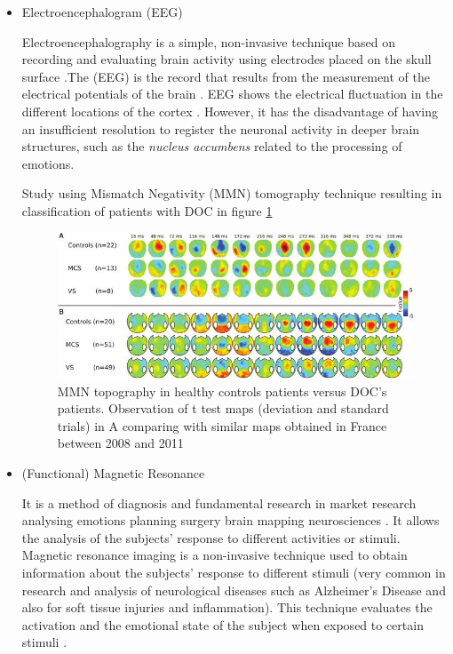  
\begin{itemize}


\item Electroencephalogram (EEG)

Electroencephalography is a simple, non-invasive technique based on recording and evaluating brain activity using electrodes placed on the skull surface \citep{Avilov2020} \citep{Da2019}.The (EEG) is the record that results from the measurement of the electrical potentials of the brain \cite{Bender2015} \citep{Xu2020}. EEG shows the electrical fluctuation in the different locations of the cortex  \citep{Zheng2016}. However, it has the disadvantage of having an insufficient resolution to register the neuronal activity in deeper brain structures, such as the \textit{nucleus accumbens} related to the processing of emotions\cite{Lang2010}. %

Study using Mismatch Negativity (MMN) tomography technique resulting in classification of patients with DOC in figure \ref{ferramentaMMN}
\begin{figure}[ht!]
\includegraphics[scale=0.7]{figures/MMN-topography-in-patients-with-disorders-of-consciousness-and-in-healthy-controls-The_W640.jpg}
\caption[DOC patient's MNN topography versus healthy control patients]{ MMN topography in healthy controls patients versus DOC’s patients. Observation of t test maps (deviation and standard trials) in A  comparing with  similar maps obtained in France between 2008 and 2011\cite{King2011}
\cite{Boly2011}} %
\label{ferramentaMMN}
\end{figure}

\item  (Functional) Magnetic Resonance

 It is a method of diagnosis and fundamental research in market research analysing emotions planning surgery brain mapping neurosciences \citep{fmri}. It allows the analysis of the subjects' response to different activities or stimuli. Magnetic resonance imaging is a non-invasive technique used to obtain information about the subjects' response to different stimuli (very common in research and analysis of neurological diseases such as Alzheimer's Disease and also for soft tissue injuries and inflammation). This technique evaluates the activation and the emotional state of the subject when exposed to certain stimuli \cite{noauthor_fmri_nodate}. 
 

\end{itemize}
